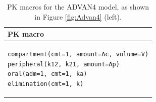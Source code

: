 \begin{table}[h!]
\setlength{\tabcolsep}{15pt}
\begin{center}
\begin{tabular}{l}
  \hline \hline
PK macro  \\[-.25ex]
  \hline
\lstset{language=NONMEMdataSet}
\begin{lstlisting}
compartment(cmt=1, amount=Ac, volume=V)
peripheral(k12, k21, amount=Ap)
oral(adm=1, cmt=1, ka)
elimination(cmt=1, k)
\end{lstlisting}
\\
  \hline
\end{tabular}
\caption{PK macros  for the ADVAN4 model, as shown in Figure \ref{fig:Advan4} (left).}
\label{tab:advan4Table}
\end{center}
\end{table}

